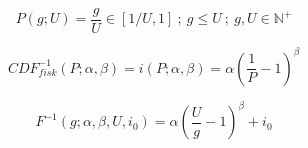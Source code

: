 \begin{equation} \label{eq:Propability}
 P(g;U)=\frac{g}{U} \in [1/U,1] ~;~ g \leq U ~;~ g,U \in \mathbb{N}^+
\end{equation}

\begin{equation} \label{eq:CDFfiskInverse}
 CDF^{-1}_{fisk}(P;\alpha,\beta)=i(P;\alpha,\beta)=
 \alpha\left(\frac{1}{P}-1\right)^\beta
\end{equation}

\begin{equation} \label{eq:FInverse}
 F^{-1}(g;\alpha,\beta,U,i_0)
 =\alpha\left(\frac{U}{g}-1\right)^\beta+i_0
\end{equation}

